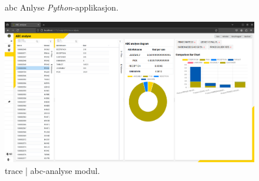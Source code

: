 \begin{figure}[H]
    \centering
    \qquad
    \caption{\label{fig:abc_analysis_python_application} \acrshort{abc} Anlyse \textit{Python}-applikasjon.}
\end{figure}

\begin{figure}[H]
\centering
\includegraphics[width=0.8\linewidth]{resources/java app/abc_analysis_trace_insight_bar.png}
\caption{\label{fig:abc_analysis_trace_insight_bar}\gls{trace} | \gls{abc}-analyse modul.}
\end{figure}


